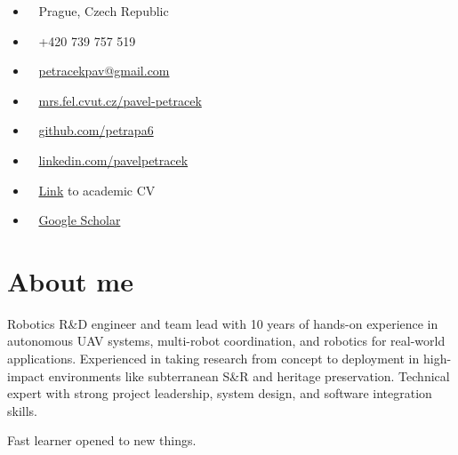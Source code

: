 \documentclass[12pt,a4paper]{article}
\newcommand\Colorhref[3][ref]{\href{#2}{\color{#1}#3}}
\begin{document}
\begin{paracol}{2}
\vspace{5mm}
\begin{itemize}
\item \faLocationArrow~ Prague, Czech Republic
\item \faPhone~ +420 739 757 519
\item \faEnvelope~ \Colorhref{mailto:petracekpav@gmail.com}{petracekpav@gmail.com}
\item \faHome~ \Colorhref{https://mrs.fel.cvut.cz/pavel-petracek}{mrs.fel.cvut.cz/pavel-petracek}
\item \faGithub~ \Colorhref{https://github.com/petrapa6}{github.com/petrapa6}
\item \faLinkedin~ \Colorhref{https://www.linkedin.com/in/pavelpetracek/}{linkedin.com/pavelpetracek}
\item \faStickyNote~ \Colorhref{https://raw.githubusercontent.com/petrapa6/cv/master/cv.pdf}{Link} to academic CV
\item \faGoogle~ \Colorhref{https://scholar.google.com/citations?user=IwzN6MQAAAAJ}{Google Scholar}
\end{itemize}

\vspace{0.2em}
\section*{About me}
Robotics R\&D engineer and team lead with 10 years of hands-on experience in autonomous UAV systems, multi-robot coordination, and robotics for real-world applications.
Experienced in taking research from concept to deployment in high-impact environments like subterranean S\&R and heritage preservation.
Technical expert with strong project leadership, system design, and software integration skills.

\vspace{0.4em}
\noindent
Fast learner opened to new things.

\vspace{0.2em}

\end{paracol}
\end{document}

